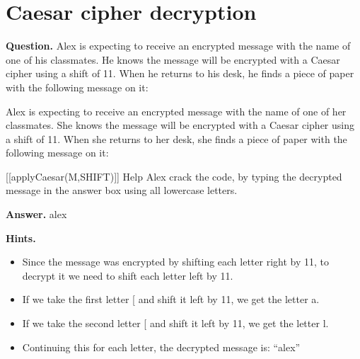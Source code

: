 \documentclass{article}
\begin{document}
\section*{Caesar cipher decryption}
\textbf{Question.} Alex is expecting to receive an encrypted message with the name of one of his classmates.
                        He knows the message will be encrypted with a Caesar cipher using a shift of 11.
                        When he returns to his desk, he finds a piece of paper with the following message on it:
                    
                        Alex is expecting to receive an encrypted message with the name of one of her classmates.
                        She knows the message will be encrypted with a Caesar cipher using a shift of 11.
                        When she returns to her desk, she finds a piece of paper with the following message on it:
                    
                    [[applyCaesar(M,SHIFT)]]
                    Help Alex crack the code, by typing the decrypted message in the answer box using all lowercase letters.

\textbf{Answer.} alex

\textbf{Hints.}
\begin{itemize}
  \item Since the message was encrypted by shifting each letter right by 11, to decrypt it we need to
                shift each letter left by 11.
  \item If we take the first letter [ and shift it left by 11,
                we get the letter a.
  \item If we take the second letter [ and shift it left by 11,
                we get the letter l.
  \item Continuing this for each letter, the decrypted message is: “alex”
\end{itemize}
\end{document}
